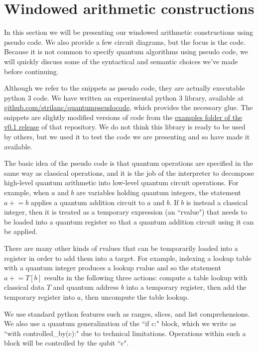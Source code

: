 \documentclass[onecolumn,unpublished]{quantumarticle}
\theoremstyle{definition}
\theoremstyle{definition}
\theoremstyle{definition}
\newcommand{\pluseq}{\mathrel{+}=}
\begin{document}
\section{Windowed arithmetic constructions}
\label{sec:results}

In this section we will be presenting our windowed arithmetic constructions using pseudo code.
We also provide a few circuit diagrams, but the focus is the code.
Because it is not common to specify quantum algorithms using pseudo code, we will quickly discuss some of the syntactical and semantic choices we've made before continuing.

Although we refer to the snippets as pseudo code, they are actually executable python 3 code.
We have written an experimental python 3 library, available at \href{https://github.com/strilanc/quantumpseudocode}{github.com/strilanc/quantumpseudocode}, which provides the necessary glue.
The snippets are slightly modified versions of code from the  \href{https://github.com/Strilanc/quantumpseudocode/tree/v0.1/examples}{examples folder of the v0.1 release} of that repository.
We do not think this library is ready to be used by others, but we used it to test the code we are presenting and so have made it available.

The basic idea of the pseudo code is that quantum operations are specified in the same way as classical operations, and it is the job of the interpreter to decompose high-level quantum arithmetic into low-level quantum circuit operations.
For example, when $a$ and $b$ are variables holding quantum integers, the statement $a \pluseq b$ applies a quantum addition circuit to $a$ and $b$.
If $b$ is instead a classical integer, then it is treated as a temporary expression (an ``rvalue") that needs to be loaded into a quantum register so that a quantum addition circuit using it can be applied.

There are many other kinds of rvalues that can be temporarily loaded into a register in order to add them into a target.
For example, indexing a lookup table with a quantum integer produces a lookup rvalue and so the statement $a \pluseq T[b]$ results in the following three actions: compute a table lookup with classical data $T$ and quantum address $b$ into a temporary register, then add the temporary register into $a$, then uncompute the table lookup.

We use standard python features such as ranges, slices, and list comprehensions.
We also use a quantum generalization of the ``if c:" block, which we write as ``with controlled\_by(c):" due to technical limitations.
Operations within such a block will be controlled by the qubit ``c".
\end{document}
